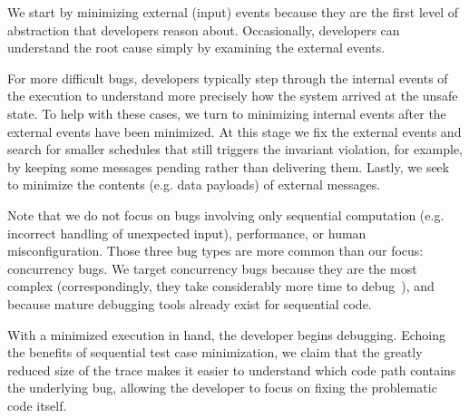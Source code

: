 We start by minimizing external (input) events because they are the first level
of abstraction that developers reason about. Occasionally, developers can
understand the root cause simply by examining the external events.

For more difficult bugs, developers typically step through the internal events of
the execution to understand more precisely how the system arrived at the unsafe
state. To help with these cases, we turn to minimizing internal events after
the external events have been minimized. At this stage we fix the external events and search for
smaller schedules that still triggers the invariant
violation, for example, by keeping some
messages pending rather than delivering them.
Lastly, we seek to minimize the contents (e.g. data payloads) of external messages.

Note that we do not focus on bugs involving only sequential computation (e.g.
incorrect handling of unexpected input), performance, or human
misconfiguration. Those three bug types
are more common than our focus: concurrency bugs.
We target concurrency bugs because they are the most complex (correspondingly, they take considerably more time to
debug~\cite{msoft_concurrency}), and because mature debugging tools already exist for sequential code.

With a minimized execution in hand, the developer begins debugging.
Echoing the benefits of sequential test case minimization, we claim that the greatly reduced size of the
trace makes it easier to understand which code path contains
the underlying bug, allowing the developer to focus on
fixing the problematic code itself.


